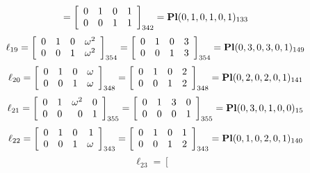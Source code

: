 \documentclass{article}
\begin{document}
{$$=
\left[
\begin{array}{*{4}c}
0  & 1  & 0  & 1\\
0  & 0  & 1  & 1\\
\end{array}
\right]_{342}
={\rm\bf Pl}(0,1,0,1,0,1 )_{133}$$
$$
\ell_{19} = 
\left[
\begin{array}{*{4}{r}}
0 & 1 & 0 & \omega^{2}\\
0 & 0 & 1 & \omega^{2}\\
\end{array}
\right]
_{354}
=
\left[
\begin{array}{*{4}c}
0  & 1  & 0  & 3\\
0  & 0  & 1  & 3\\
\end{array}
\right]_{354}
={\rm\bf Pl}(0,3,0,3,0,1 )_{149}$$
$$
\ell_{20} = 
\left[
\begin{array}{*{4}{r}}
0 & 1 & 0 & \omega \\
0 & 0 & 1 & \omega \\
\end{array}
\right]
_{348}
=
\left[
\begin{array}{*{4}c}
0  & 1  & 0  & 2\\
0  & 0  & 1  & 2\\
\end{array}
\right]_{348}
={\rm\bf Pl}(0,2,0,2,0,1 )_{141}$$
$$
\ell_{21} = 
\left[
\begin{array}{*{4}{r}}
0 & 1 & \omega^{2} & 0\\
0 & 0 & 0 & 1\\
\end{array}
\right]
_{355}
=
\left[
\begin{array}{*{4}c}
0  & 1  & 3  & 0\\
0  & 0  & 0  & 1\\
\end{array}
\right]_{355}
={\rm\bf Pl}(0,3,0,1,0,0 )_{15}$$
$$
\ell_{22} = 
\left[
\begin{array}{*{4}{r}}
0 & 1 & 0 & 1\\
0 & 0 & 1 & \omega \\
\end{array}
\right]
_{343}
=
\left[
\begin{array}{*{4}c}
0  & 1  & 0  & 1\\
0  & 0  & 1  & 2\\
\end{array}
\right]_{343}
={\rm\bf Pl}(0,1,0,2,0,1 )_{140}$$
$$
\ell_{23} = 
\left[
\begin{array}{*{4}{r}}

\end{array}$$}
\end{document}

